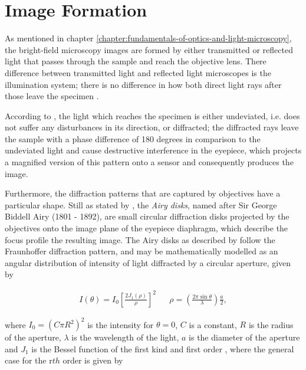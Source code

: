 \section{Image Formation}

As mentioned in chapter \ref{chapter:fundamentals-of-optics-and-light-microscopy}, the bright-field microscopy images are formed by either transmitted or reflected light that passes through the sample and reach the objective lens. There difference between transmitted light and reflected light microscopes is the illumination system; there is no difference in how both direct light rays after those leave the specimen \cite{leng2009materials}.

According to , the light which reaches the specimen is either undeviated, i.e. does not suffer any disturbances in its direction, or diffracted; the diffracted rays leave the sample with a phase difference of 180 degrees in comparison to the undeviated light and cause destructive interference in the eyepiece, which projects a magnified version of this pattern onto a sensor and consequently produces the image.

Furthermore, the diffraction patterns that are captured by objectives have a particular shape. Still as stated by , the \emph{Airy disks}, named after Sir George Biddell Airy (1801 - 1892), are small circular diffraction disks projected by the objectives onto the image plane of the eyepiece diaphragm, which describe the focus profile the resulting image. The Airy disks as described by  follow the Fraunhoffer diffraction pattern, and may be mathematically modelled as an angular distribution of intensity of light diffracted by a circular aperture, given by

\begin{align}
\label{eqn:airy_function}
I(\theta) = I_{0} 
            \left[ 
            \frac{2 J_{1} (\rho)}{\rho}
            \right]^{2}
&&
\rho = \left( 
        \frac{2 \pi \sin{\theta}}{\lambda}
        \right) \frac{a}{2},
\end{align}

\noindent where $I_{0} = (C \pi R^{2})^{2}$ is the intensity for $\theta = 0$, $C$ is a constant, $R$ is the radius of the aperture, $\lambda$ is the wavelength of the light, $a$ is the diameter of the aperture and $J_{1}$ is the Bessel function of the first kind and first order \cite{mathews1970mathematical}, where the general case for the r$th$ order is given by

